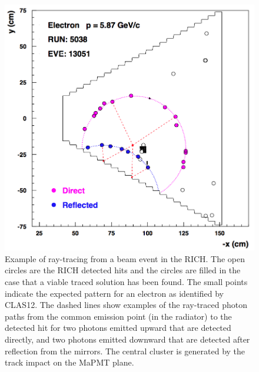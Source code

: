 \begin{figure}[t]
\begin{center}
\includegraphics[width=0.8\columnwidth]{pics/example.png}
\end{center}
\caption{Example of ray-tracing from a beam event in the RICH. The open circles are the RICH detected hits and
  the circles are filled in the case that a viable traced solution has been found. The small points indicate the
  expected pattern for an electron as identified by CLAS12. The dashed lines show examples of the ray-traced
  photon paths from the common emission point (in the radiator) to the detected hit for two photons emitted
  upward that are detected directly, and two photons emitted downward that are detected after reflection from
  the mirrors. The central cluster is generated by the track impact on the MaPMT plane.}
\label{Fig:RayShow}
\end{figure}

